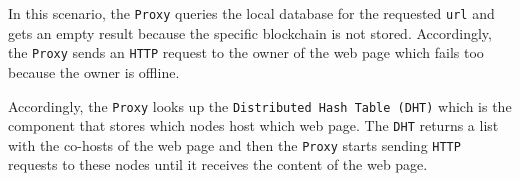 In this scenario, the \texttt{Proxy} queries the local database for the requested \texttt{url}
and gets an empty result because the specific blockchain is not stored. Accordingly, the 
\texttt{Proxy} sends an \texttt{HTTP} request to the owner of the web page which fails too 
because the owner is offline. 

Accordingly, the \texttt{Proxy} looks up the \texttt{Distributed Hash Table (DHT)} which is 
the component that stores which nodes host which web page. The \texttt{DHT} returns a list
with the co-hosts of the web page and then the \texttt{Proxy} starts sending \texttt{HTTP}
requests to these nodes until it receives the content of the web page.